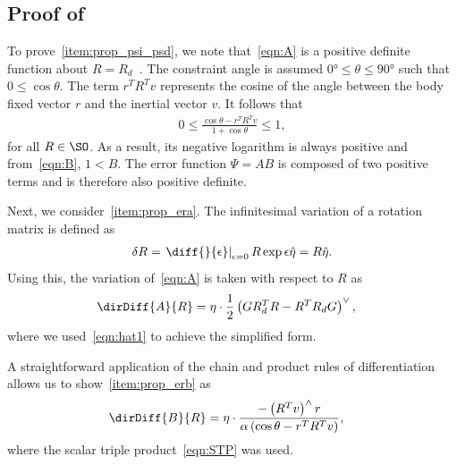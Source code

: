 \appendix
\subsection{Proof of~}\label{proof:config_error}
To prove~\cref{item:prop_psi_psd}, we note that~\cref{eqn:A} is a positive definite function about \( R = R_d \)~\cite{bullo2004}.
The constraint angle is assumed \( \ang{0} \leq \theta \leq \ang{90} \) such that \( 0 \leq \cos \theta \).
The term \( r^T R^T v \) represents the cosine of the angle between the body fixed vector \( r \) and the inertial vector \( v \). 
It follows that
\begin{align*}
	0 \leq  \frac{\cos \theta -  r^T R^T v}{1 + \cos \theta} \leq 1 ,
\end{align*}
for all \( R \in \SO \). 
As a result, its negative logarithm is always positive and from~\cref{eqn:B}, \(1 < B\).
The error function \( \Psi = A B \) is composed of two positive terms and is therefore also positive definite.

Next, we consider~\cref{item:prop_era}.
The infinitesimal variation of a rotation matrix is defined as
\begin{align*}
    \delta R = \left. \diff{}{\epsilon} \right|_{\epsilon=0} R \exp{\epsilon \hat{\eta}} = R \hat{\eta} .
\end{align*}
Using this, the variation of~\cref{eqn:A} is taken with respect to \( R \) as
\begin{align*}
	\dirDiff{A}{R} &= \eta \cdot \frac{1}{2} \left( G R_d^T R - R^T R_d G\right)^\vee ,
\end{align*}
where we used~\cref{eqn:hat1} to achieve the simplified form.

A straightforward application of the chain and product rules of differentiation allows us to show~\cref{item:prop_erb} as
\begin{align*}
	\dirDiff{B}{R} &=  \eta \cdot \frac{ - \left( R^T v\right)^\wedge r}{\alpha \left(\cos \theta - r^T R^T v \right)} ,
\end{align*}
where the scalar triple product~\cref{eqn:STP} was used.

